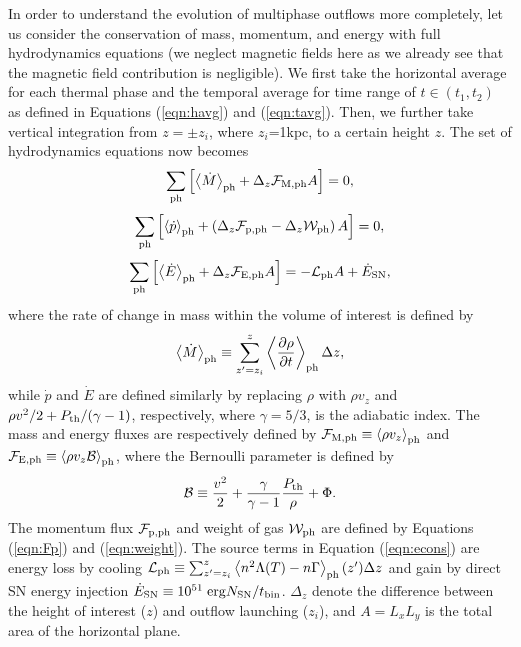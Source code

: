 \documentclass[twocolumn]{aastex62}
\newcommand\erg{\; {\rm erg}}
\newcommand\pderiv[2]{\frac{\partial {#1}}{\partial {#2}}}
\newcommand\rbrackets[1]{\left({#1}\right)}
\newcommand\sbrackets[1]{\left[{#1}\right]}
\newcommand\abrackets[1]{\left\langle{#1}\right\rangle}
\begin{document}
In order to understand the evolution of multiphase outflows more completely, let us consider the conservation of mass, momentum, and energy with full hydrodynamics equations (we neglect magnetic fields here as we already see that the magnetic field contribution is negligible). We first take the horizontal average for each thermal phase and the temporal average for time range of $t\in(t_1,t_2)$ as defined in Equations (\ref{eqn:havg}) and (\ref{eqn:tavg}). Then, we further take vertical integration from $z=\pm z_i$, where $z_i$=1kpc, to a certain height $z$. The set of hydrodynamics equations now becomes
\begin{equation}
\sum_{\rm ph}\sbrackets{\abrackets{\dot{M}}_{\rm ph} + \Delta_z\mathcal{F}_{\rm M, ph}A}= 0,
\label{eqn:mcons}
\end{equation}
\begin{equation}\label{eqn:pcons}
\sum_{\rm ph} \sbrackets{\abrackets{\dot{p}}_{\rm ph} + 
 \rbrackets{ \Delta_z\mathcal{F}_{\rm p, ph} - \Delta_z\mathcal{W}_{\rm ph}}A} =0,
\end{equation}
\begin{equation}\label{eqn:econs}
\sum_{\rm ph} \sbrackets{\abrackets{\dot{E}}_{\rm ph} +
\Delta_z\mathcal{F}_{\rm E, ph}A}= -\mathcal{L}_{\rm ph}A+ \dot{E}_{\rm SN},
\end{equation}
where the rate of change in mass within the volume of interest is defined by
\begin{equation}\label{eqn:mdot}
    \abrackets{\dot{M}}_{\rm ph} \equiv \sum_{z'=z_i}^{z}
    \abrackets{\pderiv{\rho}{t}}_{\rm ph}\Delta z,
\end{equation}
while $\dot{p}$ and $\dot{E}$ are defined similarly by replacing $\rho$ with $\rho v_z$ and $\rho v^2/2+P_{\rm th}/(\gamma-1)$, respectively, where $\gamma=5/3$, is the adiabatic index.
The mass and energy fluxes are respectively defined by
$\mathcal{F}_{\rm M,ph}\equiv \abrackets{\rho v_z}_{\rm ph}$ 
and $\mathcal{F}_{\rm E,ph}\equiv \abrackets{\rho v_z\mathcal{B}}_{\rm ph}$,
where the Bernoulli parameter is defined by
\begin{equation}\label{eqn:Bernoulli}
\mathcal{B} \equiv \frac{v^2}{2} + \frac{\gamma}{\gamma -1} \frac{P_{\rm th}}{\rho} + \Phi.
\end{equation}
The momentum flux $\mathcal{F}_{\rm p, ph}$ and weight of gas $\mathcal{W}_{\rm ph}$ are defined by Equations (\ref{eqn:Fp}) and (\ref{eqn:weight}).
The source terms in Equation (\ref{eqn:econs}) are
energy loss by cooling $\mathcal{L}_{\rm ph}\equiv \sum_{z'=z_i}^{z}\abrackets{n^2\Lambda(T)-n\Gamma}_{\rm ph}(z')\Delta z$ and gain by 
direct SN energy injection $\dot{E}_{\rm SN} \equiv 10^{51}\erg N_{\rm SN}/t_{\rm bin}$. $\Delta_z$ denote the difference between the height of interest ($z$) and outflow launching ($z_i$), and $A=L_xL_y$ is the total area of the horizontal plane.
\end{document}
